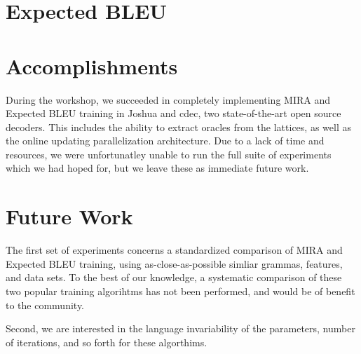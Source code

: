 \section{Expected BLEU}
\label{sec:exp_bleu
}
\section{Accomplishments}
During the workshop, we succeeded in completely implementing MIRA and Expected BLEU training in Joshua and cdec, two state-of-the-art open source decoders. This includes the ability to extract oracles from the lattices, as well as the online updating parallelization architecture. Due to a lack of time and resources, we were unfortunatley unable to run the full suite of experiments which we had hoped for, but we leave these as immediate future work.

\section{Future Work}
The first set of experiments concerns a standardized comparison of MIRA and Expected BLEU training, using as-close-as-possible simliar grammas, features, and data sets. To the best of our knowledge, a systematic comparison of these two popular training algorihtms has not been performed, and would be of benefit to the community. 

Second, we are interested in the language invariability of the parameters, number of iterations, and so forth for these algorthims. 


